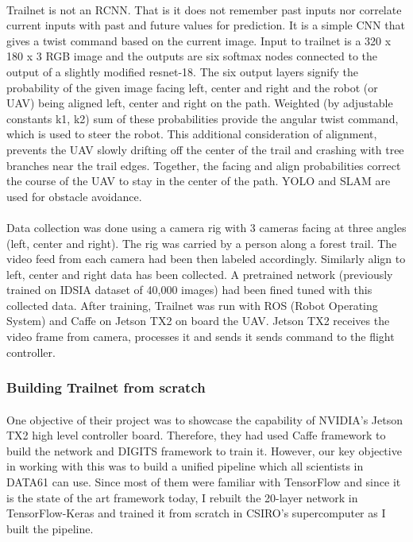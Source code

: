 \paragraph{}
Trailnet is not an RCNN. That is it does not remember past inputs nor correlate current inputs with past and future values for prediction. It is a simple CNN that gives a twist command based on the current image. Input to trailnet is a 320 x 180 x 3 RGB image and the outputs are six softmax nodes connected to the output of a slightly modified resnet-18. The six output layers signify the probability of the given image facing left, center and right and the robot (or UAV) being aligned left, center and right on the path. Weighted (by adjustable constants k1, k2) sum of these probabilities provide the angular twist command, which is used to steer the robot. This additional consideration of alignment, prevents the UAV slowly drifting off the center of the trail and crashing with tree branches near the trail edges. Together, the facing and align probabilities correct the course of the UAV to stay in the center of the path. YOLO and SLAM are used for obstacle avoidance.

\paragraph{}
Data collection was done using a camera rig with 3 cameras facing at three angles (left, center and right). The rig was carried by a person along a forest trail. The video feed from each camera had been then labeled accordingly. Similarly align to left, center and right data has been collected. A pretrained network (previously trained on IDSIA dataset %
of 40,000 images) had been fined tuned with this collected data. After training, Trailnet was run with ROS (Robot Operating System) and Caffe on Jetson TX2 on board the UAV. Jetson TX2 receives the video frame from camera, processes it and sends it sends command to the flight controller. 



\subsubsection{Building Trailnet from scratch}

\paragraph{}
One objective of their project was to showcase the capability of NVIDIA's Jetson TX2 high level controller board. Therefore, they had used Caffe framework to build the network and DIGITS framework to train it. However, our key objective in working with this was to build a unified pipeline which all scientists in DATA61 can use. Since most of them were familiar with TensorFlow and since it is the state of the art framework today, I rebuilt the 20-layer network in TensorFlow-Keras and trained it from scratch in CSIRO's supercomputer as I built the pipeline.

